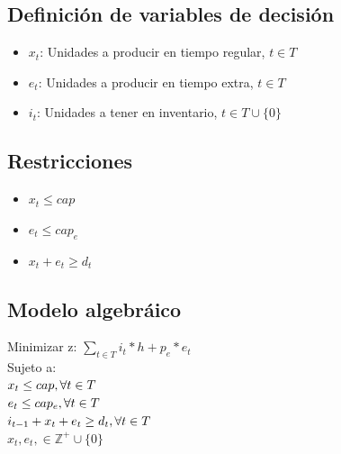 \documentclass{article}
\begin{document}
\subsection*{Definición de variables de decisión}
\begin{itemize}
    \item $x_t$: Unidades a producir en tiempo regular, $t\in T$
    \item $e_t$: Unidades a producir en tiempo extra, $t\in T$
    \item $i_t$: Unidades a tener en inventario, $t\in T \cup \{0\}$ 
\end{itemize}

\subsection*{Restricciones}
\begin{itemize}
    \item $x_t \leq cap$
    \item $e_t \leq cap_e$
    \item $x_t + e_t \geq d_t$  
\end{itemize}

\subsection*{Modelo algebráico}
Minimizar z: $\sum\limits_{t \in T} i_t*h + p_e * e_t$ \\
Sujeto a: \\
$x_t \leq cap, \hfill \forall t \in T$ \\
$e_t \leq cap_e, \hfill \forall t \in T$ \\
$i_{t-1} + x_t + e_t \geq d_t, \hfill \forall t \in T$ \\
$x_t, e_t, \in \mathbb{Z^+} \cup \{0\}$ \\
\end{document}
